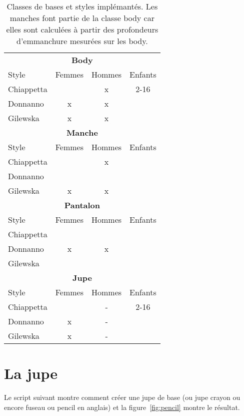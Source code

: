 \documentclass[10pt,a4paper,twoside]{report}
\begin{document}
\begin{table}[h]
\begin{center}
\begin{tabular}{lccc} \hline
\multicolumn{4}{c}{\textbf{Body}}\\
Style & Femmes & Hommes & Enfants \\ \hline
 Chiappetta & & x & 2-16\\
 Donnanno & x & x &\\
 Gilewska & x & x &\\ \hline
 \multicolumn{4}{c}{\textbf{Manche}}\\
 Style & Femmes & Hommes & Enfants \\ \hline
  Chiappetta & & x & \\
  Donnanno &  &  &\\
  Gilewska & x & x &\\ \hline
 \multicolumn{4}{c}{\textbf{Pantalon}}\\
 Style & Femmes & Hommes & Enfants \\ \hline
 Chiappetta & & & \\
 Donnanno & x & x &\\
 Gilewska & & &\\ \hline
 \multicolumn{4}{c}{\textbf{Jupe}}\\
 Style & Femmes & Hommes & Enfants \\ \hline
 Chiappetta & & - & 2-16 \\
 Donnanno & x &-  &\\
 Gilewska & x & -&\\ \hline
\end{tabular}
\end{center}
\label{tab:basic_classes}
\caption{Classes de bases et styles implémantés. Les manches font partie de la classe body car elles sont calculées à partir des profondeurs d'emmanchure mesurées sur les body.}
\end{table}



\section{La jupe}

Le script suivant montre comment créer une jupe de base (ou jupe crayon ou encore fuseau ou pencil en anglais) et la figure~\ref{fig:pencil} montre le résultat.
\end{document}
